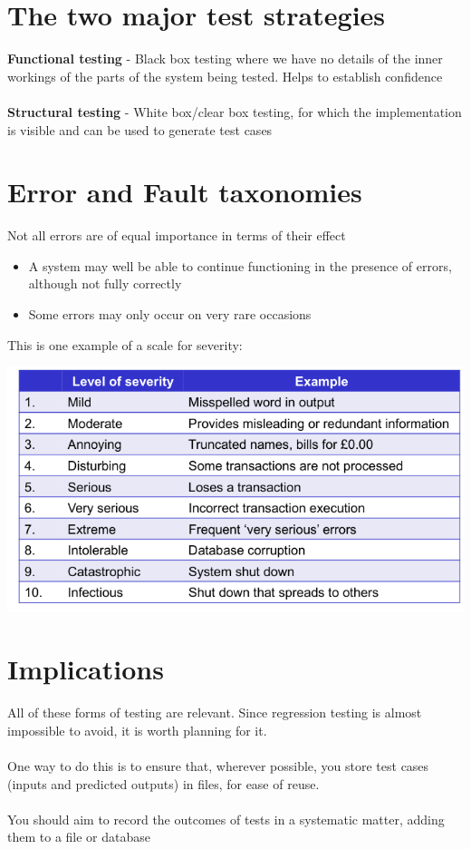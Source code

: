 \documentclass{article}[18pt]
\begin{document}
\section{The two major test strategies}
\textbf{Functional testing} - Black box testing where we have no details of the inner workings of the parts of the system being tested. Helps to establish confidence\\
\\
\textbf{Structural testing} - White box/clear box testing, for which the implementation is visible and can be used to generate test cases
\section{Error and Fault taxonomies}
Not all errors are of equal importance in terms of their effect
\begin{itemize}
	\item A system may well be able to continue functioning in the presence of errors, although not fully correctly
	\item Some errors may only occur on very rare occasions
\end{itemize}
This is one example of a scale for severity:
\begin{center}
	\includegraphics[scale=0.7]{severity}
\end{center}
\section{Implications}
All of these forms of testing are relevant. Since regression testing is almost impossible to avoid, it is worth planning for it.\\
\\
One way to do this is to ensure that, wherever possible, you store test cases (inputs and predicted outputs) in files, for ease of reuse.\\
\\
You should aim to record the outcomes of tests in a systematic matter, adding them to a file or database
\end{document}
